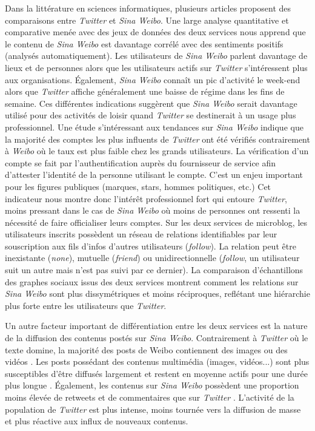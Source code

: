 Dans la littérature en sciences informatiques, plusieurs articles proposent des comparaisons entre \textit{Twitter} et \textit{Sina Weibo}. Une large analyse quantitative et comparative menée avec des jeux de données des deux services \citep{Gao2012} nous apprend que le contenu de \textit{Sina Weibo} est davantage corrélé avec des sentiments positifs (analysés automatiquement). Les utilisateurs de \textit{Sina Weibo} parlent davantage de lieux et de personnes alors que les utilisateurs actifs sur \textit{Twitter} s’intéressent plus aux organisations. Également, \textit{Sina Weibo} connaît un pic d’activité le week-end alors que \textit{Twitter} affiche généralement une baisse de régime dans les fins de semaine. Ces différentes indications suggèrent que \textit{Sina Weibo} serait davantage utilisé pour des activités de loisir quand \textit{Twitter} se destinerait à un usage plus professionnel. Une étude s’intéressant aux tendances sur \textit{Sina Weibo} \citep{Yu2011} indique que la majorité des comptes les plus influents de \textit{Twitter} ont été vérifiés contrairement à \textit{Weibo} où le taux est plus faible chez les grands utilisateurs. La vérification d’un compte se fait par l’authentification auprès du fournisseur de service afin d’attester l'identité de la personne utilisant le compte. C’est un enjeu important pour les figures publiques (marques, stars, hommes politiques, etc.) Cet indicateur nous montre donc l’intérêt professionnel fort qui entoure \textit{Twitter}, moins pressant dans le cas de \textit{Sina Weibo} où moins de personnes ont ressenti la nécessité de faire officialiser leurs comptes. Sur les deux services de microblog, les utilisateurs inscrits possèdent un réseau de relations identifiables par leur souscription aux fils d’infos d’autres utilisateurs (\textit{follow}). La relation peut être inexistante (\textit{none}), mutuelle (\textit{friend}) ou unidirectionnelle (\textit{follow}, un utilisateur suit un autre mais n’est pas suivi par ce dernier). La comparaison d’échantillons des graphes sociaux issus des deux services \citep{Chen2012} montrent comment les relations sur \textit{Sina Weibo} sont plus dissymétriques et moins réciproques, reflétant une hiérarchie plus forte entre les utilisateurs que \textit{Twitter}. 

Un autre facteur important de différentiation entre les deux services est la nature de la diffusion des contenus postés sur \textit{Sina Weibo}. Contrairement à \textit{Twitter} où le texte domine, la majorité des posts de Weibo contiennent des images ou des vidéos \citep{Zhao2012}. Les posts possédant des contenus multimédia (images, vidéos...) sont plus susceptibles d’être diffusés largement et restent en moyenne actifs pour une durée plus longue \citep{Zhao2012}. Également, les contenus sur \textit{Sina Weibo} possèdent une proportion moins élevée de retweets et de commentaires que sur \textit{Twitter} \citep{Zhao2012, Gao2012}. L’activité de la population de \textit{Twitter} est plus intense, moins tournée vers la diffusion de masse et plus réactive aux influx de nouveaux contenus. 

